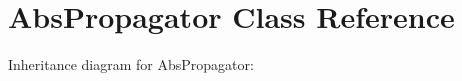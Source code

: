 \hypertarget{class_abs_propagator}{}\section{Abs\+Propagator Class Reference}
\label{class_abs_propagator}


Inheritance diagram for Abs\+Propagator\+:
